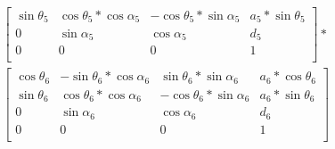 \begin{multline}
\begin{bmatrix}
\sin\theta_5 & \cos\theta_5*\cos\alpha_5 & -\cos\theta_5*\sin\alpha_5 & a_5*\sin\theta_5 \\
0 & \sin\alpha_5 & \cos\alpha_5 & d_5 \\
0 & 0 & 0 & 1 \\
\end{bmatrix}
*\\
\begin{bmatrix}
\cos\theta_6 & -\sin\theta_6*\cos\alpha_6 & \sin\theta_6*\sin\alpha_6 & a_6*\cos\theta_6 \\
\sin\theta_6 & \cos\theta_6*\cos\alpha_6 & -\cos\theta_6*\sin\alpha_6 & a_6*\sin\theta_6 \\
0 & \sin\alpha_6 & \cos\alpha_6 & d_6 \\
0 & 0 & 0 & 1 \\
\end{bmatrix}
\phantom{*}\\
\end{multline}
